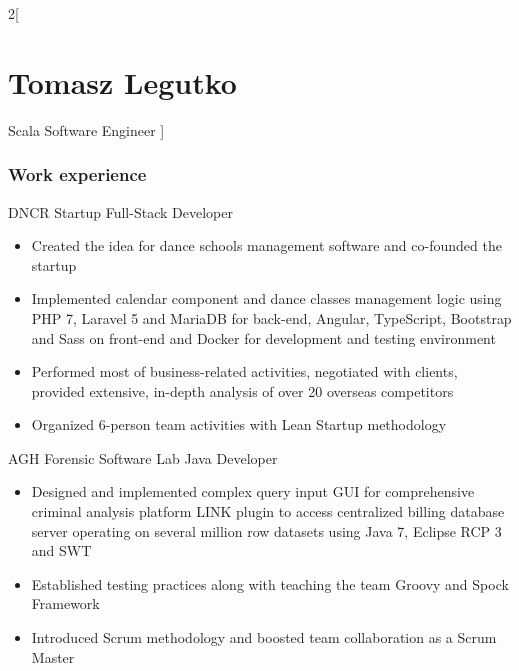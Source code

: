 \documentclass{tccv}
\begin{document}
\begin{multicols}{2}[
\part{Tomasz Legutko}{Scala Software Engineer}
]

\section{Work experience}
\begin{eventlist}

     {DNCR Startup}
     {Full-Stack Developer}
     \begin{itemize}[noitemsep,topsep=0pt]
     \item Created the idea for dance schools management software and co-founded the startup
     \item Implemented calendar component and dance classes management logic using PHP 7, Laravel 5 and MariaDB for back-end, Angular, TypeScript, Bootstrap and Sass on front-end and Docker for development and testing environment
     \item Performed most of business-related activities, negotiated with clients, provided extensive, in-depth analysis of over 20 overseas competitors
     \item Organized 6-person team activities with Lean Startup methodology
     \end{itemize}

     {AGH Forensic Software Lab}
     {Java Developer}
     \begin{itemize}[noitemsep,topsep=0pt]
     \item Designed and implemented complex query input GUI for comprehensive criminal analysis platform LINK plugin to access centralized billing database server operating on several million row datasets using Java 7, Eclipse RCP 3 and SWT
     \item Established testing practices along with teaching the team Groovy and Spock Framework
     \item Introduced Scrum methodology and boosted team collaboration as a Scrum Master
     \end{itemize}
     

\end{eventlist}
\end{multicols}
\end{document}
